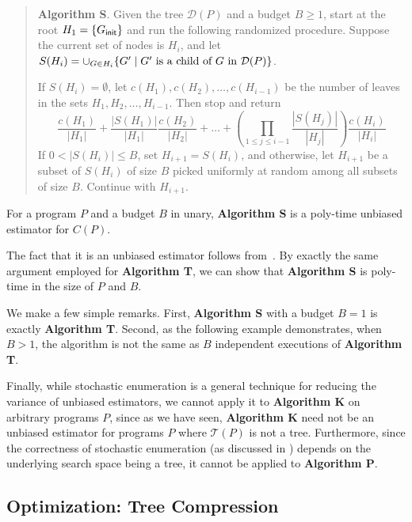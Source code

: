 \begin{verse}
    \textbf{Algorithm S}. Given the tree $\mathcal{D}(P)$ and a budget $B\geq 1$, start at the root $H_1 = {\{ G_{\mathsf{init}} \}}$ and run the following
    randomized procedure. 
    Suppose the current set of nodes is $H_i$, and let $S(H_i) = \cup_{G\in H_i} {\{ G' \mid G' \mbox{ is a child of }G \mbox{ in } \mathcal{D}(P) \}}$.
    
    \noindent If $S(H_i) = \emptyset$, let $c(H_1), c(H_2), \dots, c(H_{i-1})$ be the number of leaves in the sets $H_1,H_2,\dots,H_{i-1}$. Then stop and return 
    \[
    \frac{c(H_1)}{|H_1|} + \frac{|S(H_1)|}{|H_1|}\frac{c(H_2)}{|H_2|} + \ldots + \left( \prod_{1\leq j\leq i-1} \frac{|S(H_j)|}{|H_j|}\right)\frac{c(H_{i})}{|H_{i}|}
    \]
    If $0 < |S(H_i)| \leq B$, set $H_{i+1} = S(H_i)$, and otherwise, let $H_{i+1}$ be a subset of $S(H_i)$ of size $B$ picked uniformly at random among
    all subsets of size $B$.
    Continue with $H_{i+1}$.
\end{verse}

\begin{proposition}
    For a program $P$ and a budget $B$ in unary, \textbf{Algorithm S} is a poly-time unbiased estimator for $C(P)$.
\end{proposition}

The fact that it is an unbiased estimator follows from~\cite{rubinstein,vaisman2017}.
By exactly the same argument employed for \textbf{Algorithm T}, we can show that \textbf{Algorithm S} is poly-time in the size of $P$ and $B$.

We make a few simple remarks.
First, \textbf{Algorithm S} with a budget $B = 1$ is exactly \textbf{Algorithm T}.
Second, as the following example demonstrates, when $B > 1$, the algorithm is not the same as $B$ independent executions of \textbf{Algorithm T}.



Finally, while stochastic enumeration is a general technique for reducing the variance of unbiased estimators, we cannot apply it to \textbf{Algorithm K} on arbitrary programs $P$, since as we have seen, \textbf{Algorithm K} need not be an unbiased estimator for programs $P$ where $\mathcal{T}(P)$ is not a tree.
Furthermore, since the correctness of stochastic enumeration (as discussed in \cite{rubinstein,vaisman2017}) depends on the underlying search space being a tree, it cannot be applied to \textbf{Algorithm P}. 


\subsection{Optimization: Tree Compression}

